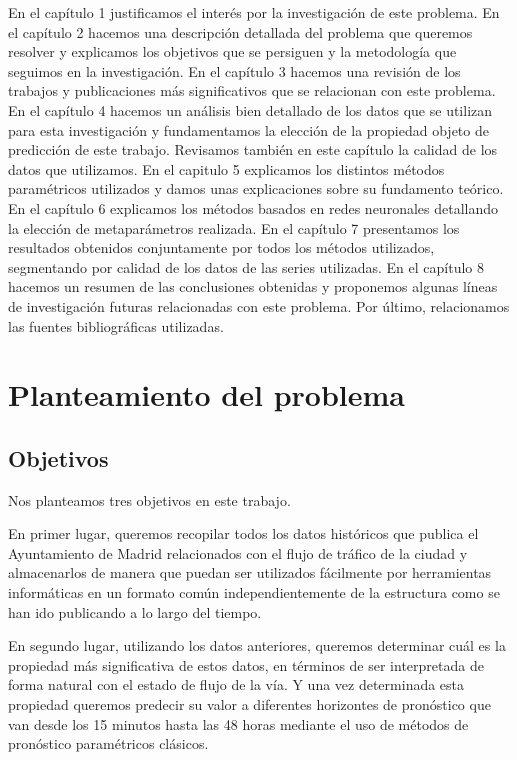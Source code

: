 \documentclass[]{book}
\begin{document}
En el capítulo 1 justificamos el interés por la investigación de este
problema. En el capítulo 2 hacemos una descripción detallada del
problema que queremos resolver y explicamos los objetivos que se
persiguen y la metodología que seguimos en la investigación. En el
capítulo 3 hacemos una revisión de los trabajos y publicaciones más
significativos que se relacionan con este problema. En el capítulo 4
hacemos un análisis bien detallado de los datos que se utilizan para
esta investigación y fundamentamos la elección de la propiedad objeto de
predicción de este trabajo. Revisamos también en este capítulo la
calidad de los datos que utilizamos. En el capitulo 5 explicamos los
distintos métodos paramétricos utilizados y damos unas explicaciones
sobre su fundamento teórico. En el capítulo 6 explicamos los métodos
basados en redes neuronales detallando la elección de metaparámetros
realizada. En el capítulo 7 presentamos los resultados obtenidos
conjuntamente por todos los métodos utilizados, segmentando por calidad
de los datos de las series utilizadas. En el capítulo 8 hacemos un
resumen de las conclusiones obtenidas y proponemos algunas líneas de
investigación futuras relacionadas con este problema. Por último,
relacionamos las fuentes bibliográficas utilizadas.

\chapter{Planteamiento del problema}\label{planteamiento-del-problema}

\section{Objetivos}\label{objetivos}

Nos planteamos tres objetivos en este trabajo.

En primer lugar, queremos recopilar todos los datos históricos que
publica el Ayuntamiento de Madrid relacionados con el flujo de tráfico
de la ciudad y almacenarlos de manera que puedan ser utilizados
fácilmente por herramientas informáticas en un formato común
independientemente de la estructura como se han ido publicando a lo
largo del tiempo.

En segundo lugar, utilizando los datos anteriores, queremos determinar
cuál es la propiedad más significativa de estos datos, en términos de
ser interpretada de forma natural con el estado de flujo de la vía. Y
una vez determinada esta propiedad queremos predecir su valor a
diferentes horizontes de pronóstico que van desde los 15 minutos hasta
las 48 horas mediante el uso de métodos de pronóstico paramétricos
clásicos.
\end{document}
